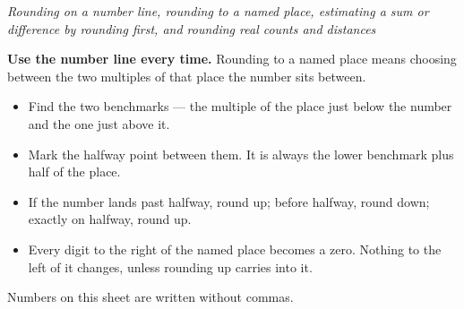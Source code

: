 \documentclass[12pt]{article}
\begin{document}

\begin{center}
\textit{Rounding on a number line, rounding to a named place, estimating a sum
or difference by rounding first, and rounding real counts and distances}
\end{center}

\noindent\small
\textbf{Use the number line every time.} Rounding to a named place means
choosing between the two multiples of that place the number sits between.
\begin{itemize}[leftmargin=1.1cm, itemsep=1pt, topsep=2pt]
  \item Find the two benchmarks --- the multiple of the place just below the
        number and the one just above it.
  \item Mark the halfway point between them. It is always the lower benchmark
        plus half of the place.
  \item If the number lands past halfway, round up; before halfway, round down;
        exactly on halfway, round up.
  \item Every digit to the right of the named place becomes a zero. Nothing to
        the left of it changes, unless rounding up carries into it.
\end{itemize}
Numbers on this sheet are written without commas.
\normalsize

\vspace{0.15cm}


\end{document}
